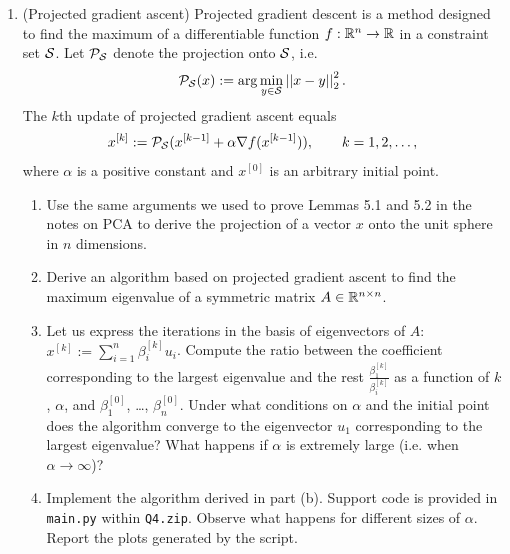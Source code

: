 \documentclass[12pt,twoside]{article}
\begin{document}
\begin{enumerate}
\item (Projected gradient ascent) Projected gradient descent is a method designed to find the maximum of a differentiable function $f:\mathbb{R}^n \rightarrow \mathbb{R}$ in a constraint set $\mathcal{ S }$. Let $\mathcal{ P }_{\mathcal{ S }}$ denote the projection onto $\mathcal{ S }$, i.e.
\begin{align}
\mathcal{ P }_{\mathcal{ S }}(x) := \arg \min_{y \in \mathcal{ S }} \left|\left| x-y \right|\right| _{2}^2.
\end{align} 
The $k$th update of projected gradient ascent equals
\begin{align}
x^{[k]} :=\mathcal{ P }_{\mathcal{ S }}( x^{[k-1]} + \alpha \nabla f (x^{[k-1]}) ), \qquad k=1,2,\ldots,
\end{align}
where $\alpha$ is a positive constant and $x^{[0]}$ is an arbitrary initial point.
\begin{enumerate}
\item Use the same arguments we used to prove Lemmas 5.1 and 5.2 in the notes on PCA to derive the projection of a vector $x$ onto the unit sphere in $n$ dimensions.
\item Derive an algorithm based on projected gradient ascent to find the maximum eigenvalue of a symmetric matrix $A\in \mathbb{R}^{n \times n}$.
\item Let us express the iterations in the basis of eigenvectors of $A$: $x^{[k]} := \sum_{i=1}^{n}\beta_i^{[k]} u_i$. Compute the ratio between the coefficient corresponding to the largest eigenvalue and the rest $\frac{\beta_1^{[k]}}{\beta_i^{[k]}}$ as a function of $k$, $\alpha$, and $\beta_1^{[0]}$, \ldots, $\beta_n^{[0]}$. Under what conditions on $\alpha$ and the initial point does the algorithm converge to the eigenvector $u_1$ corresponding to the largest eigenvalue? What happens if $\alpha$ is extremely large (i.e. when $\alpha \rightarrow \infty$)?
\item Implement the algorithm derived in part (b). Support code is provided in {\tt main.py} within {\tt Q4.zip}. Observe what happens for different sizes of $\alpha$. Report the plots generated by the script.
\end{enumerate}

\end{enumerate}
\end{document}
